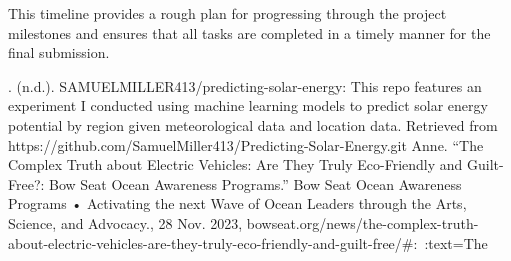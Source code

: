 \documentclass[10pt,twocolumn]{article}
\begin{document}
This timeline provides a rough plan for progressing through the project milestones and ensures that all tasks are completed in a timely manner for the final submission.



\newpage
\begin{thebibliography}{100}

. (n.d.). SAMUELMILLER413/predicting-solar-energy: This repo features an experiment I conducted using machine learning models to predict solar energy potential by region given meteorological data and location data. Retrieved from https://github.com/SamuelMiller413/Predicting-Solar-Energy.git Anne. “The Complex Truth about Electric Vehicles: Are They Truly Eco-Friendly and Guilt-Free?: Bow Seat Ocean Awareness Programs.” Bow Seat Ocean Awareness Programs • Activating the next Wave of Ocean Leaders through the Arts, Science, and Advocacy., 28 Nov. 2023, bowseat.org/news/the-complex-truth-about-electric-vehicles-are-they-truly-eco-friendly-and-guilt-free/#:~:text=The%

\end{thebibliography}





\printbibliography
\end{document}
